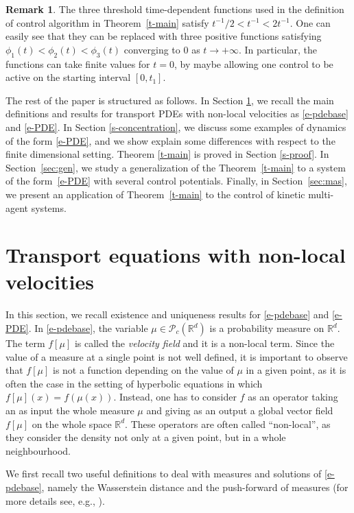 \documentclass{article}
\newcommand{\R}{\mathbb{R}}
\renewcommand{\P}{\mathcal{P}_c(\R^d)}
\theoremstyle{definition}\newtheorem{remark}{Remark}
\renewcommand{\r}[1]{\eqref{#1}}
\begin{document}
\begin{remark} The three threshold time-dependent functions used in the definition of control algorithm in Theorem~\ref{t-main} satisfy $t^{-1}/2<t^{-1}<2t^{-1}$. One can easily see that they can be replaced with three positive functions satisfying $\phi_1(t)<\phi_2(t)<\phi_3(t)$ converging to $0$ as $t\to+\infty$. In particular, the functions can take finite values for $t=0$, by maybe allowing one control to be active on the starting interval $[0,t_1]$.
\end{remark}



The rest of the paper is structured as follows. In Section \ref{s-PDE}, we recall the main definitions and results for transport PDEs with non-local velocities as \r{e-pdebase} and \r{e-PDE}. In Section \ref{s-concentration}, we discuss some examples of dynamics of the form \r{e-PDE}, and we show explain some differences with respect to the finite dimensional setting. Theorem \ref{t-main} is proved in Section \ref{s-proof}. In Section~\ref{sec:gen}, we study a generalization of the Theorem~\ref{t-main} to a system of the form~\eqref{e-PDE}  with several control potentials. Finally, in Section~\ref{sec:mas}, we present an application of Theorem~\ref{t-main} to the control of kinetic multi-agent systems.

\section{Transport equations with non-local velocities}
\label{s-PDE}

In this section, we recall existence and uniqueness results for \eqref{e-pdebase} and \r{e-PDE}.
In \r{e-pdebase}, the variable $\mu\in \P$ is a probability measure on $\R^d$. The term $f[\mu]$ is called the \textit{velocity field} and it is a non-local term. Since the value of a measure at a single point is not well defined, it is important to observe that $f[\mu]$ is not a function depending on the value of $\mu$ in a given point, as it is often the case in the setting of hyperbolic equations in which $f[\mu](x)=f(\mu(x))$. Instead, one has to consider $f$ as an operator taking an as input the whole measure $\mu$ and giving as an output a global vector field $f[\mu]$ on the whole space $\R^d$. These operators are often called ``non-local'', as they consider the density not only at a given point, but in a whole neighbourhood.

We first recall two useful definitions to deal with measures and solutions of \eqref{e-pdebase}, namely the Wasserstein distance and the push-forward of measures (for more details see, e.g., \cite{villani}).
\end{document}
